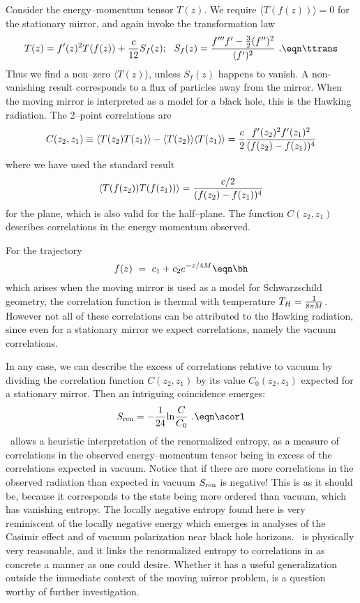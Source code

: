 Consider the
energy--momentum tensor $T(z)$. We require
$\langle T(f(z))\rangle =0$ for the stationary
mirror, and again invoke the transformation law
$$
T(z)=f^{\prime}(z)^2 T(f(z)) + {c\over 12}S_f(z);
{}~~S_f(z)={f^{\prime\prime\prime}f^{\prime}-
{3\over 2}(f^{\prime\prime})^2\over (f^{\prime})^2}~.
\eqn\ttrans
$$
Thus we find a non--zero $\langle T(z)\rangle $, unless
$S_f(z)$ happens to vanish.  A non-vanishing result
corresponds to a flux
of particles away from the mirror. When the moving mirror
is interpreted as a model for a black hole, this is
the Hawking radiation.
The 2--point correlations are
$$
C(z_2,z_1)\equiv \langle T(z_2)T(z_1)\rangle  -\langle T(z_2)\rangle
\langle T(z_1)\rangle =
{c\over 2}
{f^{\prime}(z_2)^2f^{\prime}(z_1)^2\over (f(z_2)-f(z_1))^4}
$$
where we have used the standard result
$$
\langle T(f(z_2))T(f(z_1))\rangle ={c/2\over (f(z_2)-f(z_1))^4}
$$
for the plane, which is also valid for the half--plane.
The function $C(z_2,z_1)$ describes correlations in the energy
momentum observed.



For the trajectory
$$
f(z)~=~ c_1 + c_2e^{-z/4M}
\eqn\bh
$$
which arises when the moving mirror is used as a model for
Schwarzschild geometry,
the correlation function is thermal with temperature $T_H={1\over 8\pi M}$.
However not all of these correlations can be attributed to
the Hawking radiation, since even for a stationary mirror we expect
correlations, namely the vacuum correlations.

In any case, we can describe the
excess of correlations relative to vacuum by dividing the
correlation function $C(z_2,z_1)$ by its value $C_0(z_2,z_1)$
expected for a stationary mirror.  Then an
intriguing coincidence emerges:
$$
S_{\rm ren} = -{1\over 24}{\rm ln}{C\over C_0}~.
\eqn\scorl
$$
\scorl\ allows a heuristic interpretation of the
renormalized entropy, as a measure of correlations in
the observed energy--momentum tensor being in excess of
the correlations expected in vacuum.  Notice that
if there are more correlations
in the observed radiation than expected in vacuum $S_{\rm ren}$ is
negative! This is as it should be, because it corresponds to the
state being more ordered than vacuum, which has vanishing entropy.
The locally negative entropy found here is very reminiscent of the
locally negative energy which emerges in analyses of the Casimir effect
and of vacuum polarization near black hole horizons.
\scorl\ is physically very reasonable, and it links
the renormalized entropy to correlations in
as concrete a manner as
one could desire.  Whether it has a useful generalization outside the
immediate context of the moving mirror problem, is a question worthy
of further investigation.


